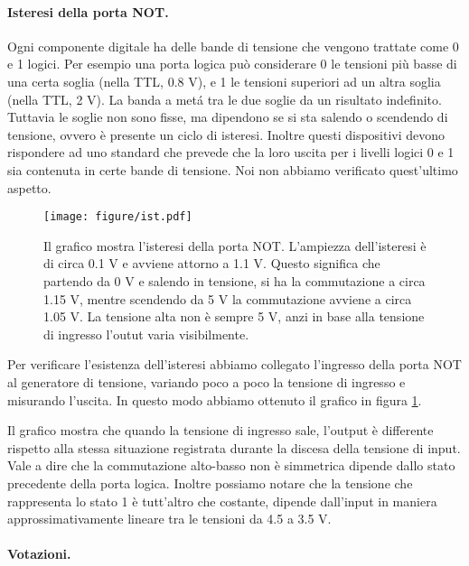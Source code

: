 \paragraph{Isteresi della porta NOT.}

Ogni componente digitale ha delle bande di tensione che vengono trattate come 0 e 1 logici. Per esempio
una porta logica può considerare 0 le tensioni più basse di una certa soglia (nella TTL, 0.8 V), 
e 1 le tensioni superiori ad un altra soglia (nella TTL, 2 V). La banda a metá tra le due soglie
da un risultato indefinito. Tuttavia le soglie non sono fisse, ma dipendono se si sta salendo o
scendendo di tensione, ovvero è presente un ciclo di isteresi. Inoltre questi dispositivi
devono rispondere ad uno standard che prevede che la loro uscita per i livelli logici 0 e 1 sia
contenuta in certe bande di tensione. Noi non abbiamo verificato quest'ultimo aspetto.

\begin{figure}[b!]
    \centering
    \texttt{[image: figure/ist.pdf]}
    \caption{Il grafico mostra l'isteresi della porta NOT. L'ampiezza dell'isteresi è di circa 0.1 V e avviene attorno a 1.1 V.
        Questo significa che partendo da 0 V e salendo in tensione, si ha la commutazione a circa 1.15 V, mentre
        scendendo da 5 V la commutazione avviene a circa 1.05 V. La tensione alta non è sempre 5 V, anzi in base alla tensione di ingresso
        l'outut varia visibilmente.}
    \label{fig:ist9}
\end{figure}

Per verificare l'esistenza dell'isteresi
abbiamo collegato l'ingresso della porta NOT al generatore di tensione, variando poco a poco la tensione
di ingresso e misurando l'uscita. In questo modo abbiamo ottenuto il grafico in figura \ref{fig:ist9}.

Il grafico mostra che quando la tensione di ingresso sale, l'output è differente rispetto alla stessa situazione
registrata durante la discesa della tensione di input. Vale a dire che la commutazione alto-basso non è simmetrica
dipende dallo stato precedente della porta logica. Inoltre possiamo notare che la tensione che rappresenta lo stato
1 è tutt'altro che costante, dipende dall'input in maniera approssimativamente lineare tra le tensioni da 4.5 a 3.5 V.

\paragraph{Votazioni.}

